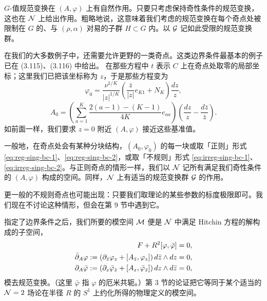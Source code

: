 $G$-值规范变换在 $(A, \varphi)$ 上有自然作用。只要只考虑保持奇性条件的规范变换，这也在 $\mathcal{N}$ 上给出作用。粗略地说，这意味着我们考虑的规范变换在每个奇点处被限制在 $G$ 的、与 $(\rho, \alpha)$ 对易的子群 $H \subset G$ 内。以 $\mathcal{G}$ 记如此受限的规范变换群。

在我们的大多数例子中，还需要允许更野的一类奇点。这类边界条件最基本的例子已在 (3.115)、(3.116) 中给出。%
在那些方程中 $t$ 表示 $C$ 上在奇点处取零的局部坐标；这里我们已把该坐标称为 $z$，于是那些方程变为
\begin{equation} \label{eq:irreg-sing-bc-1}
\varphi_0 = \frac{\nu^{1/K}}{|z|^{1/K}}
\left( \frac{\bar z}{|z| } e_{K1} + N_K \right) \frac{dz}{z},
\end{equation}
\begin{equation} \label{eq:irreg-sing-bc-2}
A_0  =  \left( \sum_{a=1}^K \frac{2(a-1)-(K-1)}{4K} e_{aa} \right)
\left( \frac{dz}{z} - \frac{d\bar z}{\bar z}\right).
\end{equation}
如前面一样，我们要求 $z = 0$ 附近 $(A, \varphi)$ 接近这些基准值。

一般地，在奇点处会有某种分块结构，$(A_0, \varphi_0)$ 的每一块或取「正则」形式 \eqref{eq:reg-sing-bc-1}、\eqref{eq:reg-sing-bc-2}，或取「不规则」形式 \eqref{eq:irreg-sing-bc-1}、\eqref{eq:irreg-sing-bc-2}。与正则奇点的情形一样，我们以 $\mathcal{N}$ 记所有满足我们奇性条件的 $(A, \varphi)$ 构成的空间。同样，$\mathcal{N}$ 上有适当的规范变换群 $\mathcal{G}$ 的作用。

更一般的不规则奇点也可能出现：只要我们取理论的某些参数的标度极限即可。我们现在不讨论这种情形，但会在第 9 节中遇到它。%

指定了边界条件之后，我们所要的模空间 $\mathcal{M}$ 便是 $\mathcal{N}$ 中满足 Hitchin 方程的解构成的子空间，
\begin{equation}\label{eq:HitchinEqs-redux}
\begin{split}
F + R^2 [\varphi , \bar\varphi ]  & = 0,\\
 \bar\partial_A \varphi :=
 \left( \partial_{\bar z} \varphi_z  + [ A_{\bar z}  ,\varphi_z] \right) d\bar{z} \wedge dz &  = 0,\\
 \partial_A \bar\varphi :=
 \left( \partial_z \bar\varphi_{\bar z}  + [ A_z,\bar\varphi_{\bar z}] \right) dz \wedge d\bar{z} & = 0,
\end{split}
\end{equation}
模去规范变换。（这里 $\bar\varphi$ 指 $\varphi$ 的厄米共轭。）第 3 节的论证把它等同于某个适当的 $\mathcal{N}=2$ 场论在半径 $R$ 的 $S^1$ 上约化所得的物理定义的模空间。

